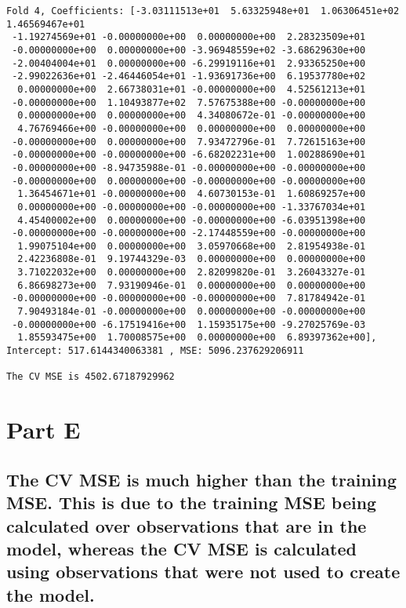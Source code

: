 \documentclass[11pt]{article}
\begin{document}
\begin{Verbatim}[commandchars=\\\{\}]
Fold 4, Coefficients: [-3.03111513e+01  5.63325948e+01  1.06306451e+02  1.46569467e+01
 -1.19274569e+01 -0.00000000e+00  0.00000000e+00  2.28323509e+01
 -0.00000000e+00  0.00000000e+00 -3.96948559e+02 -3.68629630e+00
 -2.00404004e+01  0.00000000e+00 -6.29919116e+01  2.93365250e+00
 -2.99022636e+01 -2.46446054e+01 -1.93691736e+00  6.19537780e+02
  0.00000000e+00  2.66738031e+01 -0.00000000e+00  4.52561213e+01
 -0.00000000e+00  1.10493877e+02  7.57675388e+00 -0.00000000e+00
  0.00000000e+00  0.00000000e+00  4.34080672e-01 -0.00000000e+00
  4.76769466e+00 -0.00000000e+00  0.00000000e+00  0.00000000e+00
 -0.00000000e+00  0.00000000e+00  7.93472796e-01  7.72615163e+00
 -0.00000000e+00 -0.00000000e+00 -6.68202231e+00  1.00288690e+01
 -0.00000000e+00 -8.94735988e-01 -0.00000000e+00 -0.00000000e+00
 -0.00000000e+00  0.00000000e+00 -0.00000000e+00 -0.00000000e+00
  1.36454671e+01 -0.00000000e+00  4.60730153e-01  1.60869257e+00
  0.00000000e+00 -0.00000000e+00 -0.00000000e+00 -1.33767034e+01
  4.45400002e+00  0.00000000e+00 -0.00000000e+00 -6.03951398e+00
 -0.00000000e+00 -0.00000000e+00 -2.17448559e+00 -0.00000000e+00
  1.99075104e+00  0.00000000e+00  3.05970668e+00  2.81954938e-01
  2.42236808e-01  9.19744329e-03  0.00000000e+00  0.00000000e+00
  3.71022032e+00  0.00000000e+00  2.82099820e-01  3.26043327e-01
  6.86698273e+00  7.93190946e-01  0.00000000e+00  0.00000000e+00
 -0.00000000e+00 -0.00000000e+00 -0.00000000e+00  7.81784942e-01
  7.90493184e-01 -0.00000000e+00  0.00000000e+00 -0.00000000e+00
 -0.00000000e+00 -6.17519416e+00  1.15935175e+00 -9.27025769e-03
  1.85593475e+00  1.70008575e+00  0.00000000e+00  6.89397362e+00], Intercept: 517.6144340063381 , MSE: 5096.237629206911 

The CV MSE is 4502.67187929962

    \end{Verbatim}

    \section{Part E}\label{part-e}

\subsection{The CV MSE is much higher than the training MSE. This is due
to the training MSE being calculated over observations that are in the
model, whereas the CV MSE is calculated using observations that were not
used to create the
model.}\label{the-cv-mse-is-much-higher-than-the-training-mse.-this-is-due-to-the-training-mse-being-calculated-over-observations-that-are-in-the-model-whereas-the-cv-mse-is-calculated-using-observations-that-were-not-used-to-create-the-model.}
\end{document}
